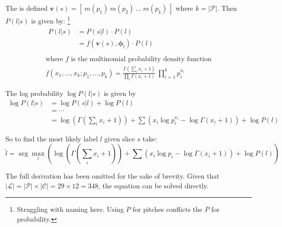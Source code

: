 \documentclass[12pt,a4paper,twoside,openany]{report} \usepackage[pdfborder={0 0 0}]{hyperref}    %
\theoremstyle{definition} \newtheorem{definition}{Definition}[section]
\begin{document}
      The  is defined $\bm{v}(s) = \left[~m(p_1)~ m(p_2)~\dots~m(p_{k})~\right]$ where $k
      = |\mathcal{P}|$. Then $P(l|s)$ is given by: \footnote{Struggling with naming here. Using $P$ for pitches
      conflicts the $P$ for probability.  } \begin{equation} \begin{gathered} \begin{aligned} P(l|s) &= P(s|l)\cdot P(l)
      \\ &= f(\bm{v}(s), \bm{\phi}_l)\cdot P(l) \\ \end{aligned} \\ \text{where $f$ is the multinomial probability
    density function} \\ f(x_1, \dots, x_k;p_1, \dots, p_k) = \frac{\Gamma \left(\sum\limits_{i} x_i
  + 1 \right)}{\prod\limits_{i} \Gamma \left(x_i + 1\right)}~\prod\limits_{i=1}^{k} p_{i}^{x_i} \end{gathered}
\label{eq:labelgivenchordtones} \end{equation}

The log probability $\log P(l|s)$ is given by \begin{equation} \begin{aligned} \log P(l|s) &= \log P(s|l) + \log P(l) \\
&= \cdots \\ &= \log \left(\Gamma\left(\sum\limits_{i} x_i + 1\right) \right) +  \sum\limits \left( x_i \log p_i^{x_i}
- \log \Gamma (x_i + 1) \right) +  \log P(l) \end{aligned} \label{eq:loglabelgivenchordtones} \end{equation}

So to find the most likely label $l$ given slice $s$ take: \begin{equation} \hat{l} = \arg\max_l \left(\log
\left(\Gamma\left(\sum\limits_{i} x_i + 1\right) \right) +  \sum\limits \left( x_i \log p_i - \log \Gamma (x_i + 1)
\right) +  \log P(l) \right) \label{eq:loglabsol} \end{equation}

The full derivation has been omitted for the sake of brevity. Given that $|\mathcal{L}| = |\mathcal{P}| \times
|\mathcal{C}| = 29 \times 12 = 348$, the equation can be solved directly. 

\end{document}
